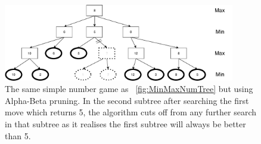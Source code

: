 \documentclass{l4proj}
\begin{document}
\begin{figure}[!ht]
\centering
\includegraphics[width=0.9\textwidth]{ABNumTree}

\caption{The same simple number game as ~\autoref{fig:MinMaxNumTree} but using Alpha-Beta pruning. In the second subtree after searching the first move which returns 5, the algorithm cuts off from any further search in that subtree as it realises the first subtree will always be better than 5. }
\label{fig:ABNumTree}
\end{figure}



%
%
\end{document}
